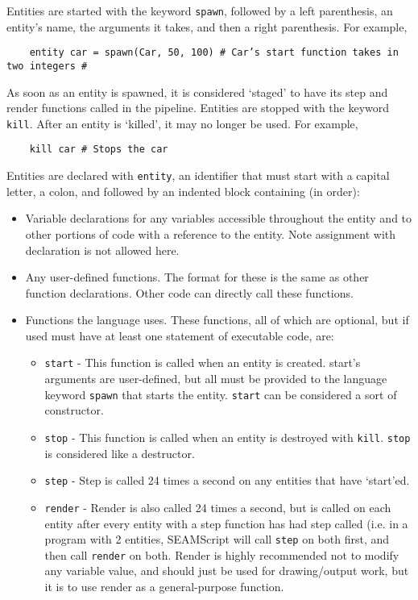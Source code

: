 \documentclass[titlepage]{article}
\begin{document}
Entities are started with the keyword \verb|spawn|, followed by a left parenthesis, an entity’s name, the arguments it takes, and then a right parenthesis. For example,
\begin{verbatim}
    entity car = spawn(Car, 50, 100) # Car’s start function takes in two integers #
\end{verbatim}
As soon as an entity is spawned, it is considered ‘staged’ to have its step and render functions called in the pipeline. 
Entities are stopped with the keyword \verb|kill|. After an entity is ‘killed’, it may no longer be used. For example,
\begin{verbatim}
    kill car # Stops the car 
\end{verbatim}
Entities are declared with \verb|entity|, an identifier that must start with a capital letter, a colon, and followed by an indented block containing (in order):
\begin{itemize}
\item Variable declarations for any variables accessible throughout the entity and to other portions of code with a reference to the entity. Note assignment with declaration is not allowed here.
\item Any user-defined functions. The format for these is the same as other function declarations. Other code can directly call these functions.
\item Functions the language uses. These functions, all of which are optional, but if used must have at least one statement of executable code, are:
\begin{itemize}
\item \verb|start| - This function is called when an entity is created. start’s arguments are user-defined, but all must be provided to the language keyword \verb|spawn| that starts the entity. \verb|start| can be considered a sort of constructor. 
\item \verb|stop| - This function is called when an entity is destroyed with \verb|kill|. \verb|stop| is considered like a destructor.
\item \verb|step| - Step is called 24 times a second on any entities that have ‘start’ed.
\item \verb|render| - Render is also called 24 times a second, but is called on each entity after every entity with a step function has had step called (i.e. in a program with 2 entities, SEAMScript will call \verb|step| on both first, and then call \verb|render| on both. Render is highly recommended not to modify any variable value, and should just be used for drawing/output work, but it is to use render as a general-purpose function.

\end{itemize}
\end{itemize}
\end{document}
